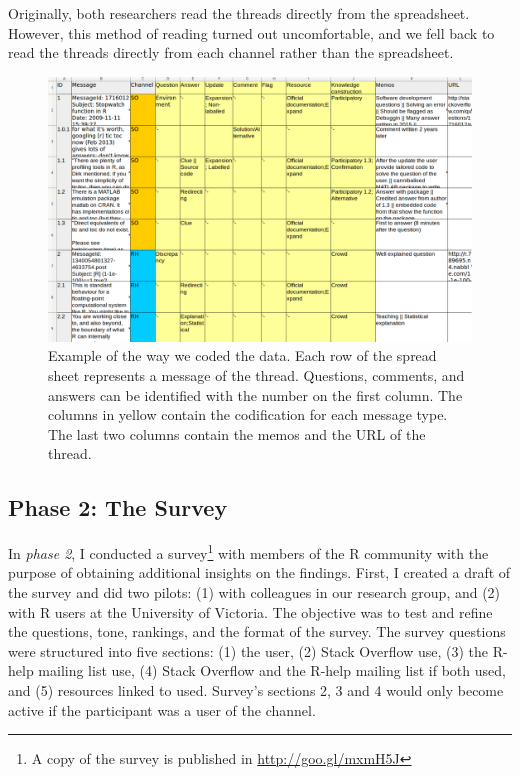 \documentclass{sig-alternate-05-2015}
\begin{document}
	Originally, both researchers read the threads directly from the spreadsheet.
	However, this method of reading turned out uncomfortable, and we fell back to read the threads directly from each channel rather than the spreadsheet.

	 	\begin{figure}[!ht]
			\centering
			\includegraphics[width=1\columnwidth]{Figures/CodingExample}
			\caption[Example of how we coded the data]{Example of the way we coded the data. Each row of the spread sheet represents a message of the thread. Questions, comments, and answers can be identified with the number on the first column. The columns in yellow contain the codification for each message type. The last two columns contain the memos and the URL of the thread.}
			\label{fig:CodingExample}
		\end{figure}

\subsection{Phase 2: The Survey} 

	In \textit{phase 2}, I conducted a survey\footnote{A copy of the survey is published in \url{http://goo.gl/mxmH5J}} with members of the R community with the purpose of obtaining additional insights on the findings.
	First, I created a draft of the survey and did two pilots:
	(1) with colleagues in our research group, and
	(2) with R users at the University of Victoria.
	The objective was to test and refine the questions, tone, rankings, and the format of the survey.
	The survey questions were structured into five sections:
	(1) the user,
	(2) Stack Overflow use,
	(3) the R-help mailing list use,
	(4) Stack Overflow and the R-help mailing list if both used, and
	(5) resources linked to used.
	Survey's sections 2, 3 and 4 would only become active if the participant was a user of the channel.
\end{document}
